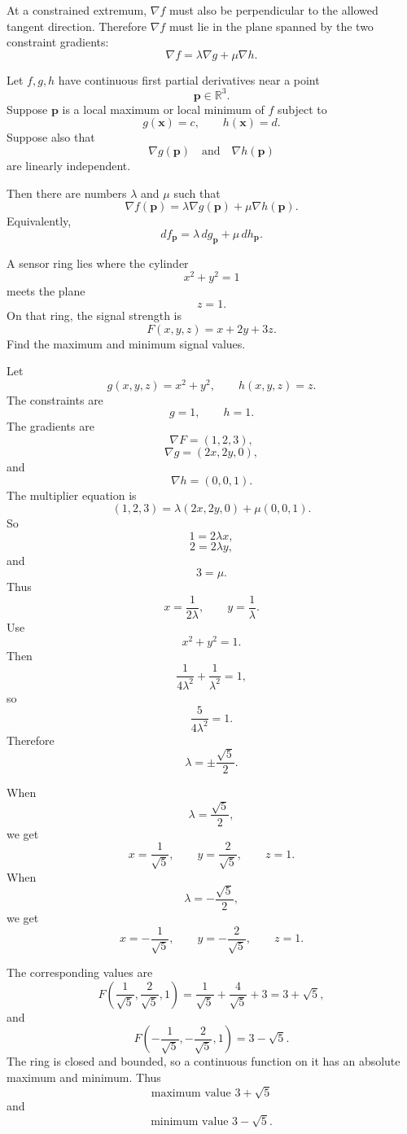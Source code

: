 At a constrained extremum, \(\nabla f\) must also be perpendicular to the allowed
tangent direction.  Therefore \(\nabla f\) must lie in the plane spanned by the two
constraint gradients:
\[
\boxed{
    \nabla f=\lambda\nabla g+\mu\nabla h.
}
\]

\begin{theorem}
Let \(f,g,h\) have continuous first partial derivatives near a point
\[
    \mathbf p\in\mathbb R^3.
\]
Suppose \(\mathbf p\) is a local maximum or local minimum of \(f\) subject to
\[
    g(\mathbf x)=c,
    \qquad
    h(\mathbf x)=d.
\]
Suppose also that
\[
    \nabla g(\mathbf p)
    \quad\text{and}\quad
    \nabla h(\mathbf p)
\]
are linearly independent.

Then there are numbers \(\lambda\) and \(\mu\) such that
\[
\boxed{
    \nabla f(\mathbf p)
    =
    \lambda\nabla g(\mathbf p)+\mu\nabla h(\mathbf p).
}
\]
Equivalently,
\[
\boxed{
    df_{\mathbf p}
    =
    \lambda\,dg_{\mathbf p}+\mu\,dh_{\mathbf p}.
}
\]
\end{theorem}

\begin{example}
A sensor ring lies where the cylinder
\[
    x^2+y^2=1
\]
meets the plane
\[
    z=1.
\]
On that ring, the signal strength is
\[
    F(x,y,z)=x+2y+3z.
\]
Find the maximum and minimum signal values.

Let
\[
    g(x,y,z)=x^2+y^2,
    \qquad
    h(x,y,z)=z.
\]
The constraints are
\[
    g=1,
    \qquad
    h=1.
\]
The gradients are
\[
    \nabla F=(1,2,3),
\]
\[
    \nabla g=(2x,2y,0),
\]
and
\[
    \nabla h=(0,0,1).
\]
The multiplier equation is
\[
    (1,2,3)
    =
    \lambda(2x,2y,0)+\mu(0,0,1).
\]
So
\[
    1=2\lambda x,
\]
\[
    2=2\lambda y,
\]
and
\[
    3=\mu.
\]
Thus
\[
    x=\frac{1}{2\lambda},
    \qquad
    y=\frac{1}{\lambda}.
\]
Use
\[
    x^2+y^2=1.
\]
Then
\[
    \frac{1}{4\lambda^2}+\frac{1}{\lambda^2}=1,
\]
so
\[
    \frac{5}{4\lambda^2}=1.
\]
Therefore
\[
    \lambda=\pm\frac{\sqrt5}{2}.
\]

When
\[
    \lambda=\frac{\sqrt5}{2},
\]
we get
\[
    x=\frac{1}{\sqrt5},
    \qquad
    y=\frac{2}{\sqrt5},
    \qquad
    z=1.
\]
When
\[
    \lambda=-\frac{\sqrt5}{2},
\]
we get
\[
    x=-\frac{1}{\sqrt5},
    \qquad
    y=-\frac{2}{\sqrt5},
    \qquad
    z=1.
\]

The corresponding values are
\[
    F\left(\frac{1}{\sqrt5},\frac{2}{\sqrt5},1\right)
    =
    \frac{1}{\sqrt5}+\frac{4}{\sqrt5}+3
    =
    3+\sqrt5,
\]
and
\[
    F\left(-\frac{1}{\sqrt5},-\frac{2}{\sqrt5},1\right)
    =
    3-\sqrt5.
\]
The ring is closed and bounded, so a continuous function on it has an absolute maximum
and minimum.  Thus
\[
\boxed{
    \text{maximum value }3+\sqrt5
}
\]
and
\[
\boxed{
    \text{minimum value }3-\sqrt5.
}
\]
\end{example}

